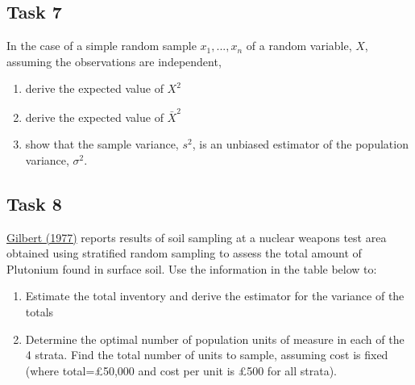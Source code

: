 \documentclass[
  letterpaper,
  DIV=11,
  numbers=noendperiod]{scrartcl}
\providecommand{\tightlist}{%
  \setlength{\itemsep}{0pt}\setlength{\parskip}{0pt}}\usepackage{longtable,booktabs,array}
\begin{document}
\subsection*{Task 7}\label{task-7}

In the case of a simple random sample \(x_1,..., x_n\) of a random
variable, \(X\), assuming the observations are independent,

\begin{enumerate}
\def\labelenumi{(\alph{enumi})}
\tightlist
\item
  derive the expected value of \(X^2\)
\item
  derive the expected value of \(\bar{X}^2\)
\item
  show that the sample variance, \(s^2\), is an unbiased estimator of
  the population variance, \(\sigma^2\).
\end{enumerate}

\subsection*{Task 8}\label{task-8}

\href{https://go.exlibris.link/DnZPRrww}{Gilbert (1977)} reports results
of soil sampling at a nuclear weapons test area obtained using
stratified random sampling to assess the total amount of Plutonium found
in surface soil. Use the information in the table below to:

\begin{enumerate}
\def\labelenumi{(\alph{enumi})}
\item
  Estimate the total inventory and derive the estimator for the variance
  of the totals
\item
  Determine the optimal number of population units of measure in each of
  the 4 strata. Find the total number of units to sample, assuming cost
  is fixed (where total=£50,000 and cost per unit is £500 for all
  strata).
\end{enumerate}
\end{document}
